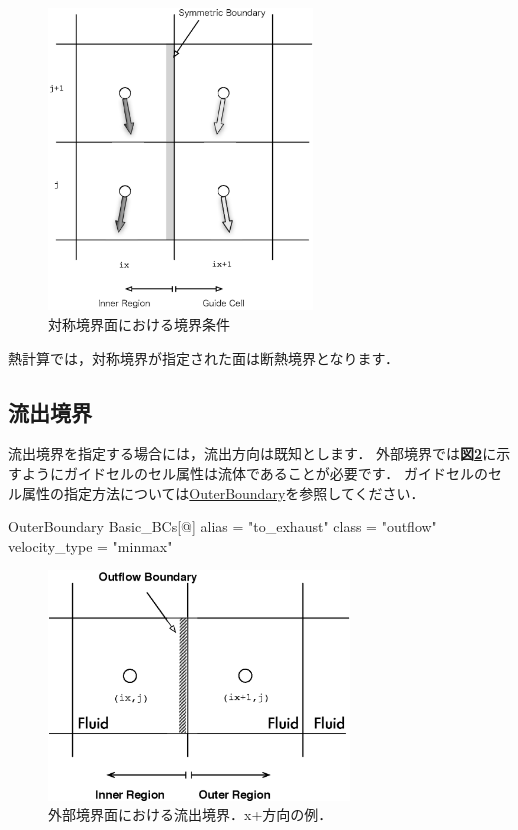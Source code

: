 \begin{figure}[htbp]
\begin{center}
\includegraphics[width=7cm,clip]{symmetric.eps}
\end{center}
\caption{対称境界面における境界条件}
\label{fig:symmetric plane}
\end{figure}

熱計算では，対称境界が指定された面は断熱境界となります．


\pagebreak
\subsection{流出境界}

流出境界を指定する場合には，流出方向は既知とします．
外部境界では\textbf{図\ref{fig:outflow BC outer}}に示すようにガイドセルのセル属性は流体であることが必要です．
ガイドセルのセル属性の指定方法については\hyperlink{tgt:outer_boundary}{OuterBoundary}を参照してください．

{\small
\begin{program}
OuterBoundary {
  Basic_BCs[@] {
    alias    = "to_exhaust"
    class    = "outflow"
    velocity_type = "minmax"
  }
}
\end{program}
}

\begin{figure}[htbp]
\begin{center}
\includegraphics[width=8cm,clip]{outflowBC_outer.eps}
\end{center}
\caption{外部境界面における流出境界．x+方向の例．}
\label{fig:outflow BC outer}
\end{figure}

